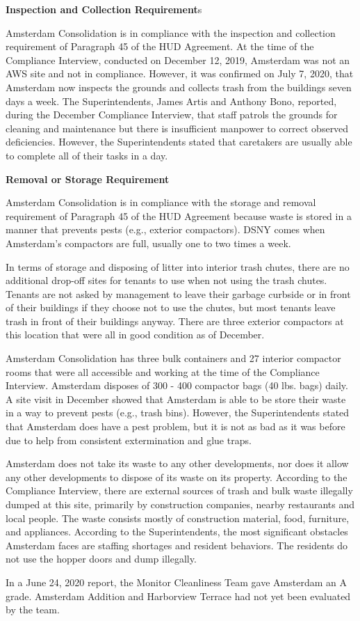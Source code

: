 
\textbf{Inspection and Collection Requirement}s

Amsterdam Consolidation is in compliance with the inspection and collection requirement of Paragraph 45 of the HUD Agreement. At the time of the Compliance Interview, conducted on December 12, 2019, Amsterdam was not an AWS site and not in compliance. However, it was confirmed on July 7, 2020, that Amsterdam now inspects the grounds and collects trash from the buildings seven days a week. The Superintendents, James Artis and Anthony Bono, reported, during the December Compliance Interview, that staff patrols the grounds for cleaning and maintenance but there is insufficient manpower to correct observed deficiencies. However, the Superintendents stated that caretakers are usually able to complete all of their tasks in a day.



\textbf{Removal or Storage Requirement}

Amsterdam Consolidation is in compliance with the storage and removal requirement of Paragraph 45 of the HUD Agreement because waste is stored in a manner that prevents pests (e.g., exterior compactors). DSNY comes when Amsterdam's compactors are full, usually one to two times a week.

In terms of storage and disposing of litter into interior trash chutes, there are no additional drop-off sites for tenants to use when not using the trash chutes. Tenants are not asked by management to leave their garbage curbside or in front of their buildings if they choose not to use the chutes, but most tenants leave trash in front of their buildings anyway. There are three exterior compactors at this location that were all in good condition as of December.

Amsterdam Consolidation has three bulk containers and 27 interior compactor rooms that were all accessible and working at the time of the Compliance Interview. Amsterdam disposes of 300 - 400 compactor bags (40 lbs. bags) daily. A site visit in December showed that Amsterdam is able to be store their waste in a way to prevent pests (e.g., trash bins). However, the Superintendents stated that Amsterdam does have a pest problem, but it is not as bad as it was before due to help from consistent extermination and glue traps. 

Amsterdam does not take its waste to any other developments, nor does it allow any other developments to dispose of its waste on its property. According to the Compliance Interview, there are external sources of trash and bulk waste illegally dumped at this site, primarily by construction companies, nearby restaurants and local people. The waste consists mostly of construction material, food, furniture, and appliances. According to the  Superintendents, the most significant obstacles Amsterdam faces are staffing shortages and resident behaviors. The residents do not use the hopper doors and dump illegally. 

In a June 24, 2020 report, the Monitor Cleanliness Team gave Amsterdam an A grade. Amsterdam Addition and Harborview Terrace had not yet been evaluated by the team.